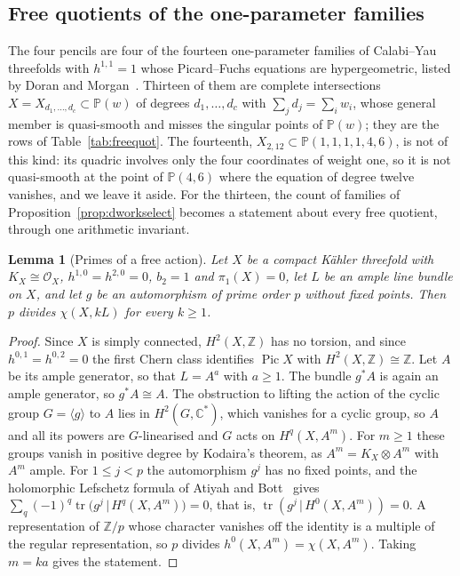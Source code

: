 \documentclass[11pt]{amsart}
\newtheorem{lemma}[theorem]{Lemma}
\theoremstyle{definition}
\theoremstyle{remark}
\newcommand{\Z}{\mathbb{Z}}
\newcommand{\C}{\mathbb{C}}
\newcommand{\PP}{\mathbb{P}}
\newcommand{\cO}{\mathcal{O}}
\begin{document}
\subsection{Free quotients of the one-parameter families}\label{sec:freequot}

The four pencils are four of the fourteen one-parameter families of
Calabi--Yau threefolds with $h^{1,1}=1$ whose Picard--Fuchs equations are
hypergeometric, listed by Doran and Morgan~\cite{DM06}. Thirteen of them are
complete intersections $X=X_{d_1,\dots,d_c}\subset\PP(w)$ of degrees
$d_1,\dots,d_c$ with $\sum_jd_j=\sum_iw_i$, whose general member is
quasi-smooth and misses the singular points of $\PP(w)$; they are the rows
of Table~\ref{tab:freequot}. The fourteenth, $X_{2,12}\subset
\PP(1,1,1,1,4,6)$, is not of this kind: its quadric involves only the four
coordinates of weight one, so it is not quasi-smooth at the point of
$\PP(4,6)$ where the equation of degree twelve vanishes, and we leave it
aside. For the thirteen, the count of families of
Proposition~\ref{prop:dworkselect} becomes a statement about every free
quotient, through one arithmetic invariant.

\begin{lemma}[Primes of a free action]\label{lem:freeprime}
Let $X$ be a compact K\"ahler threefold with $K_X\cong\cO_X$,
$h^{1,0}=h^{2,0}=0$, $b_2=1$ and $\pi_1(X)=0$, let $L$ be an ample line
bundle on $X$, and let $g$ be an automorphism of prime order $p$ without
fixed points. Then $p$ divides $\chi(X,kL)$ for every $k\ge1$.
\end{lemma}

\begin{proof}
Since $X$ is simply connected, $H^2(X,\Z)$ has no torsion, and since
$h^{0,1}=h^{0,2}=0$ the first Chern class identifies $\operatorname{Pic}X$
with $H^2(X,\Z)\cong\Z$. Let $A$ be its ample generator, so that $L=A^a$
with $a\ge1$. The bundle $g^*A$ is again an ample generator, so
$g^*A\cong A$. The obstruction to lifting the action of the cyclic group
$G=\langle g\rangle$ to $A$ lies in $H^2(G,\C^*)$, which vanishes for a
cyclic group, so $A$ and all its powers are $G$-linearised and $G$ acts on
$H^q(X,A^m)$. For $m\ge1$ these groups vanish in positive degree by
Kodaira's theorem, as $A^m=K_X\otimes A^m$ with $A^m$ ample. For $1\le
j<p$ the automorphism $g^j$ has no fixed points, and the holomorphic
Lefschetz formula of Atiyah and Bott~\cite{AB68} gives
$\sum_q(-1)^q\operatorname{tr}\big(g^j\,|\,H^q(X,A^m)\big)=0$, that is,
$\operatorname{tr}(g^j\,|\,H^0(X,A^m))=0$. A representation of $\Z/p$ whose
character vanishes off the identity is a multiple of the regular
representation, so $p$ divides $h^0(X,A^m)=\chi(X,A^m)$. Taking $m=ka$
gives the statement.
\end{proof}
\end{document}
